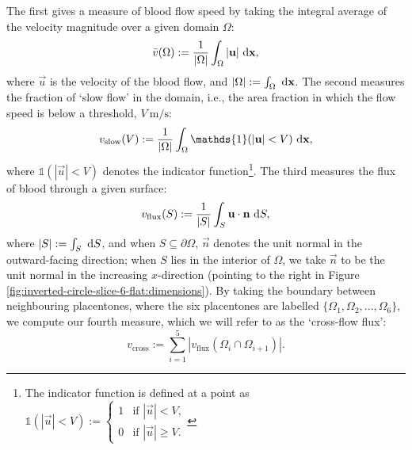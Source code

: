         The first gives a measure of blood flow speed by taking the integral average of the velocity magnitude over a given domain $\Omega$:
        \begin{equation}
            \bar{v}(\Omega) := \frac{1}{|\Omega|} \int_{\Omega} |\boldsymbol{\mathbf{u}}| ~\mathrm{d} \boldsymbol{\mathbf{x}},
            \label{eq:eff-v}
        \end{equation}
        where $\vec{u}$ is the velocity of the blood flow, and $|\Omega| := \int_\Omega ~\mathrm{d} \boldsymbol{\mathbf{x}}$. The second measures the fraction of `slow flow' in the domain, i.e., the area fraction in which the flow speed is below a threshold, $V~\unit{\metre\per\second}$:
        \begin{equation}
            v_\text{slow}(V) := \frac{1}{|\Omega|} \int_\Omega \mathds{1}(|\vec{u}| < V) \diff \vec{x},
            \label{eq:eff-v-slow}
        \end{equation}
        where $\mathds{1}(|\vec{u}| < V)$ denotes the indicator function\footnote{The indicator function is defined at a point as $\mathds{1}(|\vec{u}| < V) := \begin{cases}1 & \text{if } |\vec{u}| < V, \\0 & \text{if } |\vec{u}| \geq V.\end{cases}$}. The third measures the flux of blood through a given surface:
        \begin{equation}
            v_\text{flux}(S) := \frac{1}{|S|} \int_S \boldsymbol{\mathbf{u}} \cdot \boldsymbol{\mathbf{n}} ~\mathrm{d} S,
            \label{eq:eff-v-flux}
        \end{equation}
        where $|S| := \int_S ~\mathrm{d} S$, and when $S \subseteq \partial\Omega$, $\vec{n}$ denotes the unit normal in the outward-facing direction; when $S$ lies in the interior of $\Omega$, we take $\vec{n}$ to be the unit normal in the increasing $x$-direction (pointing to the right in Figure \ref{fig:inverted-circle-slice-6-flat:dimensions}). By taking the boundary between neighbouring placentones, where the six placentones are labelled $\{ \Omega_1, \Omega_2, ..., \Omega_6 \}$, we compute our fourth measure, which we will refer to as the `cross-flow flux':
        \begin{equation}
            v_\text{cross} := \sum_{i=1}^5 |v_\text{flux}(\Omega_i \cap \Omega_{i+1})|.
            \label{eq:eff-v-cross}
        \end{equation}
        
